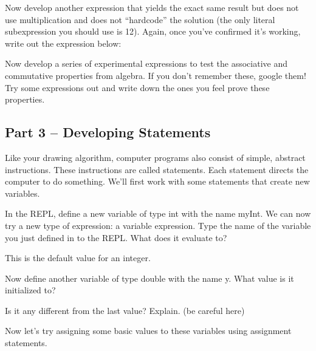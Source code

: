 \begin{exer}
Now develop another expression that yields the exact same result but does not 
use multiplication and does not ``hardcode'' the solution (the only literal 
subexpression you should use is 12). Again, once you've confirmed it's working,
write out the expression below:

\evalline
\end{exer}


\begin{exer}
Now develop a series of experimental expressions to test the associative and commutative properties from algebra. If you don't remember these, google them! Try some expressions out and write down the ones you feel prove these properties. 
\evallinefour
\end{exer}
\initialbox

\subsection{Part 3 -- Developing Statements}

Like your drawing algorithm, computer programs also consist of simple, abstract 
instructions. These instructions are called statements. Each statement directs
the computer to do something. We'll first work with some statements that 
create new variables. 

\begin{exer}
In the REPL, define a new variable of type int with the name myInt. 
We can now try a new type of expression: a variable expression. Type the name of the variable you just defined in to the REPL. What does it evaluate to?

\evalline

This is the default value for an integer.

\end{exer}


\begin{exer}
Now define another variable of type double with the name y. What value is it initialized to?  


\evalline


Is it any different from the last value? Explain. (be careful here)

\evallinetwo

\end{exer}

Now let's try assigning some basic values to these variables using assignment 
statements. 

